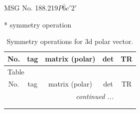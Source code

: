 \documentclass[fleqn,8pt]{jsarticle}
\begin{document}
\setcounter{MaxMatrixCols}{32}

\renewcommand{\tablename}{Table~}
\renewcommand{\figurename}{Figure~}
\begin{center}
\LARGE
MSG No. 188.219\quad$P\bar{6}c'2'$
\end{center}
* symmetry operation
\renewcommand{\arraystretch}{1.3}
\begin{longtable}{ccccc}
\caption{Symmetry operations for 3d polar vector.}
 \\
 \hline \hline
No. & tag & matrix (polar) & det & TR \\ \hline \endfirsthead

\multicolumn{4}{l}{\tablename\ \thetable{}} \\
 \hline \hline
No. & tag & matrix (polar) & det & TR \\ \hline \endhead

 \hline \hline
\multicolumn{4}{r}{\footnotesize\it continued ...} \\ \endfoot

 \hline \hline
\multicolumn{4}{r}{} \\ \endlastfoot


\end{longtable}
\end{document}
